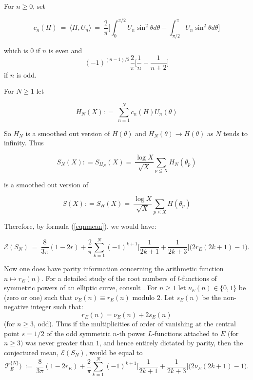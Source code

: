 \documentclass[11pt]{article}
\theoremstyle{plain}
\theoremstyle{definition}
\numberwithin{equation}{section}
\numberwithin{figure}{section}
\numberwithin{table}{section}
\begin{document}
For $n \ge 0$, set


\begin{equation}
c_n(H)  \ = \ \langle H, U_n\rangle \ = \ {\frac{2}{\pi}}\big[\int_0^{\pi/2}U_n\sin^2\theta d \theta - \int_{\pi/2}^{\pi}U_n\sin^2\theta d \theta \big]
\end{equation}


which is $0$ if $n$ is even and $$(-1)^{(n-1)/2}{\frac{2}{\pi}}\big[{\frac{1}{n}} + {\frac{1}{n+2}}\big]$$ if $n$ is odd.



For $N \ge 1$ let

\begin{equation}
H_N(X): = \ \sum_{n=1}^Nc_n(H)U_n(\theta)
\end{equation}


So $H_N$ is a smoothed out version of $H(\theta)$ and $H_N(\theta) \to H(\theta)$ as $N $ tends to infinity.  Thus

\begin{equation}
S_N(X): = S_{H_N}(X) = \ {\frac{\log X}{{\sqrt{X}}}}\sum_{p \le X}H_N(\theta_p)
\end{equation}


is a smoothed out version of

\begin{equation}\label{smooth}
S(X): = S_{H}(X) = \ {\frac{\log X}{{\sqrt{X}}}}\sum_{p \le X}H(\theta_p)
\end{equation}

Therefore, by formula (\ref{eqnmean}), we would have:

\begin{equation}\label{early}
{\mathcal E}(S_N)\ = \ {\frac{8}{3\pi}}(1-2r) + {\frac{2}{\pi}} \sum_{k=1}^{N}  (-1)^{k+1}\big[{\frac{1}{2k+1}} + {\frac{1}{2k+3}}\big]\big(2r_E(2k+1)-1\big).
\end{equation}


Now one does have  parity information concerning the arithmetic function $n \mapsto r_E(n)$. For a detailed study of the root numbers of $l$-functions of symmetric powers of an elliptic curve, consult \cite{DMW}.
 For $n \ge 1$ let $ \nu_E(n) \in \{0,1\}$ be (zero or one) such that  $ \nu_E(n) \equiv r_E(n)$ modulo $2$. Let $s_E(n)$ be the non-negative integer such that:
 $$r_E(n) = \nu_E(n) + 2s_E(n)$$  (for $n\ge 3$, odd).
Thus if the multiplicities of order of vanishing at the central point $s=1/2$ of the odd symmetric $n$-th power $L$-functions attached to $E$ (for $n \ge 3)$ was never greater than  $1$, and hence entirely dictated by parity, then the conjectured mean, ${\mathcal E}(S_N)$, would be equal to
\begin{equation}\label{min}
{\mathcal T}_E^{\{N\}})\ := \ {\frac{8}{3\pi}}(1-2r_E) + {\frac{2}{\pi}} \sum_{k=1}^{N}  (-1)^{k+1}\big[{\frac{1}{2k+1}} + {\frac{1}{2k+3}}\big]\big(2\nu_E(2k+1)-1\big).
\end{equation}
\end{document}

